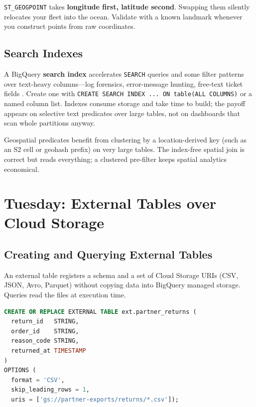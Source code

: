 \begin{pitfall}
\texttt{ST\_GEOGPOINT} takes \textbf{longitude first, latitude second}. Swapping them silently relocates your fleet into the ocean. Validate with a known landmark whenever you construct points from raw coordinates.
\end{pitfall}

\subsection{Search Indexes}
A BigQuery \textbf{search index} accelerates \texttt{SEARCH} queries and some filter patterns over text-heavy columns---log forensics, error-message hunting, free-text ticket fields \cite{googlecloudbigquerydocs}. Create one with \texttt{CREATE SEARCH INDEX ... ON table(ALL COLUMNS)} or a named column list. Indexes consume storage and take time to build; the payoff appears on selective text predicates over large tables, not on dashboards that scan whole partitions anyway.

\begin{tipbox}
Geospatial predicates benefit from clustering by a location-derived key (such as an S2 cell or geohash prefix) on very large tables. The index-free spatial join is correct but reads everything; a clustered pre-filter keeps spatial analytics economical.
\end{tipbox}

\section{Tuesday: External Tables over Cloud Storage}

\subsection{Creating and Querying External Tables}
An external table registers a schema and a set of Cloud Storage URIs (CSV, JSON, Avro, Parquet) without copying data into BigQuery managed storage. Queries read the files at execution time.

\begin{lstlisting}[language=SQL,caption={External table over CSV exports in Cloud Storage.}]
CREATE OR REPLACE EXTERNAL TABLE ext.partner_returns (
  return_id   STRING,
  order_id    STRING,
  reason_code STRING,
  returned_at TIMESTAMP
)
OPTIONS (
  format = 'CSV',
  skip_leading_rows = 1,
  uris = ['gs://partner-exports/returns/*.csv']);
\end{lstlisting}

